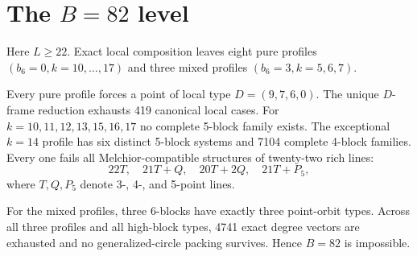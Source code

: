 \section{The $B=82$ level}

Here $L\ge22$.  Exact local composition leaves eight pure profiles $(b_6=0,k=10,\ldots,17)$ and three mixed profiles $(b_6=3,k=5,6,7)$.

Every pure profile forces a point of local type $D=(9,7,6,0)$.  The unique $D$-frame reduction exhausts 419 canonical local cases.  For $k=10,11,12,13,15,16,17$ no complete 5-block family exists.  The exceptional $k=14$ profile has six distinct 5-block systems and 7104 complete 4-block families.  Every one fails all Melchior-compatible structures of twenty-two rich lines:
\[
 22T,
 \quad 21T+Q,
 \quad 20T+2Q,
 \quad 21T+P_5,
\]
where $T,Q,P_5$ denote 3-, 4-, and 5-point lines.

For the mixed profiles, three 6-blocks have exactly three point-orbit types.  Across all three profiles and all high-block types, 4741 exact degree vectors are exhausted and no generalized-circle packing survives.  Hence $B=82$ is impossible.

